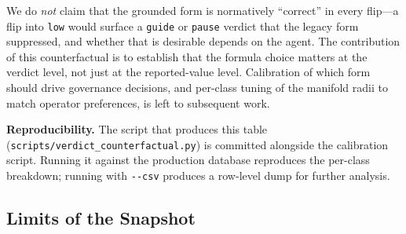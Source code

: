 \documentclass[11pt,twocolumn]{article}
\begin{document}
We do \emph{not} claim that the grounded form is normatively
``correct'' in every flip---a flip into \texttt{low} would surface
a \texttt{guide} or \texttt{pause} verdict that the legacy form
suppressed, and whether that is desirable depends on the
agent. The contribution of this counterfactual is to establish
that the formula choice matters at the verdict level, not just at
the reported-value level. Calibration of which form should drive
governance decisions, and per-class tuning of the manifold radii
to match operator preferences, is left to subsequent work.

\textbf{Reproducibility.} The script that produces this table
(\texttt{scripts/verdict\_counterfactual.py}) is committed
alongside the calibration script. Running it against the
production database reproduces the per-class breakdown; running
with \texttt{-{}-csv} produces a row-level dump for further
analysis.

\subsection{Limits of the Snapshot}
\label{sec:limits-snapshot}
\end{document}

